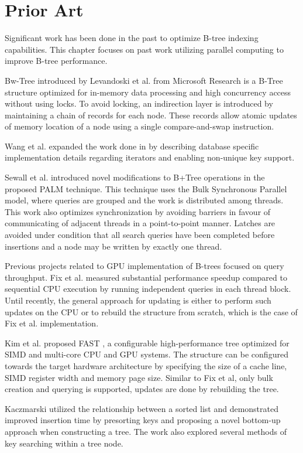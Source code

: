 \section{Prior Art}

Significant work has been done in the past to optimize B-tree indexing capabilities. This chapter focuses on past work utilizing parallel computing to improve B-tree performance.

Bw-Tree introduced by Levandoski et al. \cite{bw-tree} from Microsoft Research is a B-Tree structure optimized for in-memory data processing and high concurrency access without using locks. To avoid locking, an indirection layer is introduced by maintaining a chain of records for each node. These records allow atomic updates of memory location of a node using a single compare-and-swap instruction.

Wang et al. \cite{openbw-tree} expanded the work done in \cite{bw-tree} by describing database specific implementation details regarding iterators and enabling non-unique key support.

Sewall et al. \cite{palm} introduced novel modifications to B+Tree operations in the proposed PALM technique. This technique uses the Bulk Synchronous Parallel model, where queries are grouped and the work is distributed among threads. This work also optimizes synchronization by avoiding barriers in favour of communicating of adjacent threads in a point-to-point manner. Latches are avoided under condition that all search queries have been completed before insertions and a node may be written by exactly one thread.

Previous projects related to GPU implementation of B-trees focused on query throughput. Fix et al. \cite{fix2011accelerating} measured substantial performance speedup compared to sequential CPU execution by running independent queries in each thread block. Until recently, the general approach for updating is either to perform such updates on the CPU or to rebuild the structure from scratch, which is the case of Fix et al. implementation.

Kim et al. proposed FAST \cite{fast}, a configurable high-performance tree optimized for SIMD and multi-core CPU and GPU systems. The structure can be configured towards the target hardware architecture by specifying the size of a cache line, SIMD register width and memory page size. Similar to Fix et al, only bulk creation and querying is supported, updates are done by rebuilding the tree.

Kaczmarski \cite{kaczmarski} utilized the relationship between a sorted list and demonstrated improved insertion time by presorting keys and proposing a novel bottom-up approach when constructing a tree. The work also explored several methods of key searching within a tree node.

